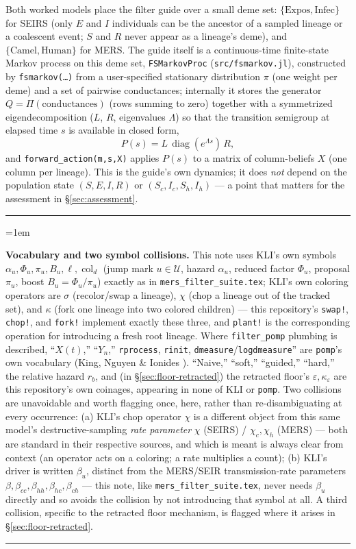 \documentclass[11pt]{article}
\newcommand{\col}{\operatorname{col}}
\theoremstyle{plain}
\newenvironment{notebox}{%
  \par\addvspace{8pt}\noindent%
  {\color{chline}\rule{\linewidth}{0.8pt}}\par\smallskip%
  \begingroup\color{chline!40!black}%
  \leftskip=1em\relax
}{%
  \par\endgroup\smallskip%
  {\color{chline}\rule{\linewidth}{0.8pt}}\par\addvspace{8pt}%
}
\begin{document}
Both worked models place the filter guide over a small deme set: $\{\text{Expos},\text{Infec}\}$
for SEIRS (only $E$ and $I$ individuals can be the ancestor of a sampled lineage or a coalescent
event; $S$ and $R$ never appear as a lineage's deme), and $\{\text{Camel},\text{Human}\}$ for MERS.
The guide itself is a continuous-time finite-state Markov process on this deme set,
\texttt{FSMarkovProc} (\texttt{src/fsmarkov.jl}), constructed by \texttt{fsmarkov(\ldots)} from a
user-specified stationary distribution $\pi$ (one weight per deme) and a set of pairwise
conductances; internally it stores the generator $Q=\Pi(\text{conductances})$ (rows summing to
zero) together with a symmetrized eigendecomposition ($L$, $R$, eigenvalues $\Lambda$) so that the
transition semigroup at elapsed time $s$ is available in closed form,
\[
P(s) = L\,\operatorname{diag}(e^{\Lambda s})\,R,
\]
and \texttt{forward\_action(m,s,X)} applies $P(s)$ to a matrix of column-beliefs $X$ (one column
per lineage). This is the guide's own dynamics; it does \emph{not} depend on the population state
$(S,E,I,R)$ or $(S_c,I_c,S_h,I_h)$ --- a point that matters for the assessment in
\S\ref{sec:assessment}.

\begin{notebox}
\textbf{Vocabulary and two symbol collisions.} This note uses KLI's own symbols
$\alpha_u,\Phi_u,\pi_u,B_u,\ell,\col_d$ (jump mark $u\in\mathcal U$, hazard $\alpha_u$, reduced
factor $\Phi_u$, proposal $\pi_u$, boost $B_u=\Phi_u/\pi_u$) exactly as in
\texttt{mers\_filter\_suite.tex}; KLI's own coloring operators are $\sigma$ (recolor/swap a
lineage), $\chi$ (chop a lineage out of the tracked set), and $\kappa$ (fork one lineage into two
colored children) --- this repository's \texttt{swap!}, \texttt{chop!}, and \texttt{fork!}
implement exactly these three, and \texttt{plant!} is the corresponding operation for introducing a
fresh root lineage. Where \texttt{filter\_pomp} plumbing is described, ``$X(t)$,'' ``$Y_n$,''
\texttt{rprocess}, \texttt{rinit}, \texttt{dmeasure}/\texttt{logdmeasure}'' are \texttt{pomp}'s own
vocabulary (King, Nguyen \& Ionides \cite{KNI}). ``Naive,'' ``soft,'' ``guided,'' ``hard,'' the
relative hazard $r_b$, and (in \S\ref{sec:floor-retracted}) the retracted floor's
$\varepsilon,\kappa_\varepsilon$ are this repository's own coinages, appearing in none of KLI or
\texttt{pomp}. Two collisions are unavoidable and worth flagging once, here, rather than
re-disambiguating at every occurrence: (a) KLI's chop operator $\chi$ is a different object from
this same model's destructive-sampling \emph{rate parameter} $\chi$ (SEIRS) / $\chi_c,\chi_h$
(MERS) --- both are standard in their respective sources, and which is meant is always clear from
context (an operator acts on a coloring; a rate multiplies a count); (b) KLI's driver is written
$\beta_u$, distinct from the MERS/SEIR transmission-rate parameters $\beta,\beta_{cc},\beta_{hh},
\beta_{hc},\beta_{ch}$ --- this note, like \texttt{mers\_filter\_suite.tex}, never needs $\beta_u$
directly and so avoids the collision by not introducing that symbol at all. A third collision,
specific to the retracted floor mechanism, is flagged where it arises in
\S\ref{sec:floor-retracted}.
\end{notebox}
\end{document}
